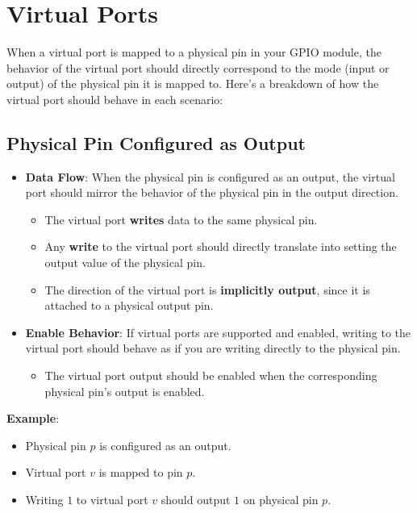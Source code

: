 
\section{Virtual Ports}

When a virtual port is mapped to a physical pin in your GPIO module, the behavior of the virtual port should directly correspond to the mode (input or output) of the physical pin it is mapped to. Here's a breakdown of how the virtual port should behave in each scenario:

\subsection{Physical Pin Configured as Output}
\begin{itemize}
    \item \textbf{Data Flow}: When the physical pin is configured as an output, the virtual port should mirror the behavior of the physical pin in the output direction.
    \begin{itemize}
        \item The virtual port \textbf{writes} data to the same physical pin.
        \item Any \textbf{write} to the virtual port should directly translate into setting the output value of the physical pin.
        \item The direction of the virtual port is \textbf{implicitly output}, since it is attached to a physical output pin.
    \end{itemize}
    \item \textbf{Enable Behavior}: If virtual ports are supported and enabled, writing to the virtual port should behave as if you are writing directly to the physical pin.
    \begin{itemize}
        \item The virtual port output should be enabled when the corresponding physical pin’s output is enabled.
    \end{itemize}
\end{itemize}

\textbf{Example}:
\begin{itemize}
    \item Physical pin $p$ is configured as an output.
    \item Virtual port $v$ is mapped to pin $p$.
    \item Writing $1$ to virtual port $v$ should output $1$ on physical pin $p$.
\end{itemize}

